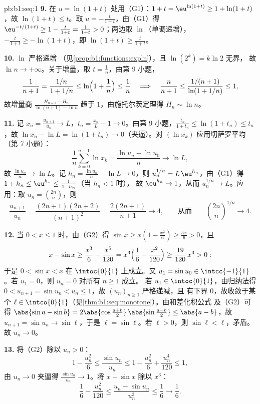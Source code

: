 \begin{solution}{pb:b1:seq:1}
\textbf{9.} 在 $u = \ln(1+t)$ 处用（G1）：$1 + t = \eu^{\ln(1+t)} \geq
1 + \ln(1+t)$，故 $\ln(1+t) \leq t$。取 $u =
-\frac{t}{1+t}$，由（G1）得 $\eu^{-t/(1+t)} \geq 1 - \frac{t}{1+t} =
\frac{1}{1+t} > 0$；两边取 $\ln$（单调递增），
$-\frac{t}{1+t} \geq -\ln(1+t)$，即 $\ln(1+t) \geq
\frac{t}{1+t}$。

\textbf{10.} $\ln$ 严格递增
（见\cref{prop:b1:functions:expln}），且 $\ln(2^k) = k\ln 2$ 无界，
故 $\ln n \to +\infty$。关于增量，取 $t =
\frac1n$，由第 9 小题，
\[
\frac 1{n+1} = \frac{1/n}{1 + 1/n} \leq
\ln\Bigl(1 + \frac1n\Bigr) \leq \frac1n
\quad\Longrightarrow\quad
\frac{n}{n+1} \leq \frac{1/(n+1)}{\ln(1 + 1/n)} \leq 1 ,
\]
故增量商 $\frac{H_{n+1} - H_n}{\ln(n+1) - \ln
n}$ 趋于 $1$，由施托尔茨定理得 $H_n \sim \ln n$。

\textbf{11.} 记 $x_n = \frac{u_{n+1}}{u_n} \to L$，$t_n =
\frac{x_n}{L} - 1 \to 0$。由第 9 小题，$\frac{t_n}{1 + t_n} \leq
\ln(1 + t_n) \leq t_n$，故 $\ln x_n - \ln L = \ln(1 + t_n) \to
0$（夹逼）。对 $(\ln x_k)$ 应用切萨罗平均（第 7 小题）：
\[
\frac1n \sum_{k=0}^{n-1} \ln x_k = \frac{\ln u_n - \ln u_0}{n}
\longrightarrow \ln L ,
\]
故 $\frac{\ln u_n}{n} \to \ln L$。记 $h_n = \frac{\ln u_n}{n}
- \ln L \to 0$，则 $u_n^{1/n} = L\,\eu^{h_n}$，由（G1）得
$1 + h_n \leq \eu^{h_n} \leq \frac{1}{1 - h_n}$（当 $h_n < 1$ 时），
故 $\eu^{h_n} \to 1$，从而 $u_n^{1/n} \to L$。应用：取 $u_n =
\binom{2n}{n}$，则
\[
\frac{u_{n+1}}{u_n} = \frac{(2n+1)(2n+2)}{(n+1)^2}
= \frac{2(2n+1)}{n+1} \longrightarrow 4 ,
\qquad\text{从而}\qquad
\binom{2n}{n}^{1/n} \to 4 .
\]

\textbf{12.} 当 $0 < x \leq 1$ 时，由（G2）得 $\sin x \geq x(1 -
\frac{x^2}{6}) \geq \frac{5x}{6} > 0$，且
\[
x - \sin x \geq \frac{x^3}{6} - \frac{x^5}{120}
= x^3\Bigl(\frac16 - \frac{x^2}{120}\Bigr)
\geq \frac{19}{120}\,x^3 > 0 :
\]
于是 $0 < \sin x < x$ 在 $\intoc{0}{1}$ 上成立。又 $u_1 = \sin u_0
\in \intcc{-1}{1}$。若 $u_1 = 0$，则 $u_n = 0$ 对所有 $n \geq 1$ 成立。
若 $u_1 \in \intoc{0}{1}$，由归纳法得 $0 < u_{n+1} = \sin u_n
< u_n \leq 1$，故 $(u_n)_{n\geq1}$ 严格递减，且
有下界 $0$，故收敛于某个 $\ell \in
\intco{0}{1}$（见\cref{thm:b1:seq:monotone}）。由和差化积公式
及（G2）可得 $\abs{\sin a - \sin b} = 2\abs{\cos
\frac{a+b}{2}}\,\abs{\sin\frac{a-b}{2}} \leq \abs{a - b}$，故
$u_{n+1} = \sin u_n \to \sin \ell$，于是 $\ell = \sin\ell$。若 $\ell
> 0$，则 $\sin\ell < \ell$，矛盾。故 $u_n \to 0$。

\textbf{13.} 将（G2）除以 $u_n > 0$：
\[
1 - \frac{u_n^2}{6} \leq \frac{\sin u_n}{u_n} \leq 1 -
\frac{u_n^2}{6} + \frac{u_n^4}{120} \leq 1 ,
\]
由 $u_n \to 0$ 夹逼得 $\frac{\sin u_n}{u_n} \to 1$。将
$x - \sin x$ 除以 $x^3$：
\[
\frac16 - \frac{u_n^2}{120} \leq \frac{u_n - \sin u_n}{u_n^3}
\leq \frac16 \longrightarrow \frac16 .
\]


\end{solution}
